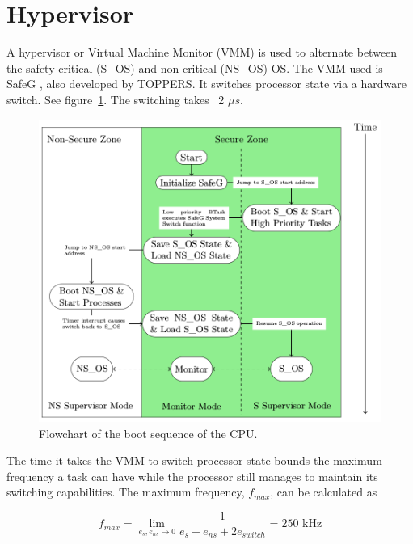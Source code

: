 \section{Hypervisor}

A hypervisor or Virtual Machine Monitor (VMM) is used to alternate between the safety-critical (S\_OS) and non-critical (NS\_OS) OS. The VMM used is SafeG \cite{website:safeg}, also developed by TOPPERS. It switches processor state via a hardware switch. See figure~\ref{fig:modeswitch}. The switching takes ~2 $\mu s$.

\begin{figure}[H]
\centering
\includegraphics[width=\textwidth]{./img/literature_modeswitch.png}
\caption{Flowchart of the boot sequence of the CPU. \cite{zaki2016}}\label{fig:modeswitch}
\end{figure}

The time it takes the VMM to switch processor state bounds the maximum frequency a task can have while the processor still manages to maintain its switching capabilities. The maximum frequency, $f_{max}$, can be calculated as

$$f_{max} = \lim_{e_s, e_{ns} \to 0} \frac{1}{e_s+e_{ns}+2e_{switch}} = 250\textrm{ kHz}$$

